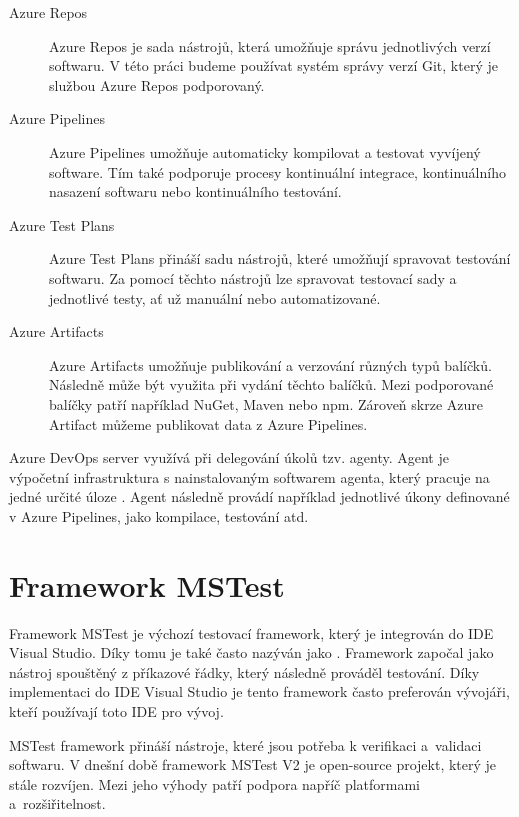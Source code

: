 \begin{description}
    \item[Azure Repos] Azure Repos je sada nástrojů, která umožňuje správu jednotlivých verzí softwaru. V této práci budeme používat systém správy verzí Git, který je službou Azure Repos podporovaný. \cite{azure_repos}
    \item[Azure Pipelines] Azure Pipelines umožňuje automaticky kompilovat a testovat vyvíjený software. Tím také podporuje procesy kontinuální integrace, kontinuálního nasazení softwaru nebo kontinuálního testování. \cite{azure_pipelines}
    \item[Azure Test Plans] Azure Test Plans přináší sadu nástrojů, které umožňují spravovat testování softwaru. Za pomocí těchto nástrojů lze spravovat testovací sady a jednotlivé testy, ať už manuální nebo automatizované.~\cite{azure_test_plans}
    \item[Azure Artifacts] Azure Artifacts umožňuje publikování a verzování různých typů balíčků. Následně může být využita při vydání těchto balíčků. Mezi podporované balíčky patří například NuGet, Maven nebo npm. Zároveň skrze Azure Artifact můžeme publikovat data z Azure Pipelines. \cite{azure_artifacts}
\end{description}

Azure DevOps server využívá při delegování úkolů tzv. agenty. Agent je výpočetní infrastruktura s nainstalovaným softwarem agenta, který pracuje na jedné určité úloze \cite{agent_docs}. Agent následně provádí například jednotlivé úkony definované v Azure Pipelines, jako kompilace, testování atd.

\section{Framework MSTest}

Framework MSTest je výchozí testovací framework, který je integrován do IDE Visual Studio. Díky tomu je také často nazýván jako . Framework započal jako nástroj spouštěný z příkazové řádky, který následně prováděl testování. Díky implementaci do IDE Visual Studio je tento framework často preferován vývojáři, kteří používají toto IDE pro vývoj. 

MSTest framework přináší nástroje, které jsou potřeba k verifikaci a~validaci softwaru. V dnešní době framework MSTest V2 je open-source projekt, který je stále rozvíjen. Mezi jeho výhody patří podpora napříč platformami a~rozšiřitelnost. \cite{mstest_descr}


